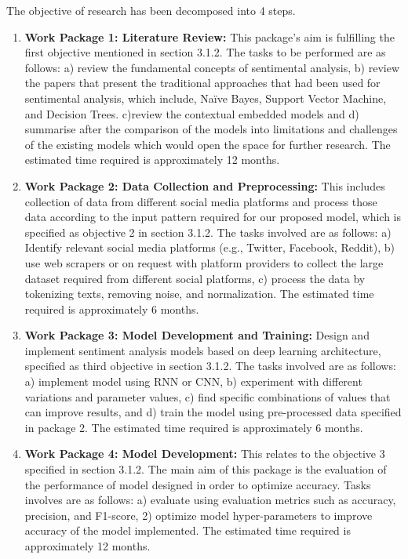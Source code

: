 \documentclass[a4paper,onecolumn,11pt]{article}
\begin{document}
The objective of research has been decomposed into 4 steps.
\begin{enumerate}
  \item \textbf{Work Package 1: Literature Review:} This package’s aim is fulfilling the first objective mentioned in section 3.1.2. The tasks to be performed are as follows: a) review the fundamental concepts of sentimental analysis, b) review the papers that present the traditional approaches that had been used for sentimental analysis, which include, Naïve Bayes, Support Vector Machine, and Decision Trees. c)review the contextual embedded models and d) summarise after the comparison of the models into limitations and challenges of the existing models which would open the space for further research. The estimated time required is approximately 12 months. 

  \item \textbf{Work Package 2:  Data Collection and Preprocessing: }  This includes collection of data from different social media platforms and process those data according to the input pattern required for our proposed model, which is specified as objective 2 in section 3.1.2. The tasks involved are as follows: a) Identify relevant social media platforms (e.g., Twitter, Facebook, Reddit), b) use web scrapers or on request with platform providers to collect the large dataset required from different social platforms, c) process the data by tokenizing texts, removing noise, and normalization. The estimated time required is approximately 6 months.
  \item \textbf{Work Package 3: Model Development and Training:}  Design and implement sentiment analysis models based on deep learning architecture, specified as third objective in section 3.1.2. The tasks involved are as follows: a) implement model using RNN or CNN, b) experiment with different variations and parameter values, c) find specific combinations of values that can improve results, and d) train the model using pre-processed data specified in package 2. The estimated time required is approximately 6 months.

  \item \textbf{Work Package 4: Model Development:} This relates to the objective 3 specified in section 3.1.2.  The main aim of this package is the evaluation of the performance of model designed in order to optimize accuracy. Tasks involves are as follows: a) evaluate using evaluation metrics such as accuracy, precision, and F1-score, 2) optimize model hyper-parameters to improve accuracy of the model implemented. The estimated time required is approximately 12 months.
\end{enumerate}
\end{document}
